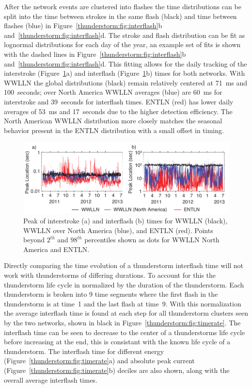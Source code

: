 After the network events are clustered into flashes the time distributions can be split into the time between strokes in the same flash (black) and time between flashes (blue) in Figure~\ref{thunderstorm:fig:interflash}b and~\ref{thunderstorm:fig:interflash}d.
The stroke and flash distribution can be fit as lognormal distributions for each day of the year, an example set of fits is shown with the dashed lines in Figure~\ref{thunderstorm:fig:interflash}b and~\ref{thunderstorm:fig:interflash}d.
This fitting allows for the daily tracking of the interstroke (Figure~\ref{thunderstorm:fig:stability}a) and interflash (Figure~\ref{thunderstorm:fig:stability}b) times for both networks.
With WWLLN the global distributions (black) remain relatively centered at 71~ms and 100~seconds; over North America WWLLN averages (blue) are 60~ms for interstroke and 39~seconds for interflash times.
ENTLN (red) has lower daily averages of 53~ms and 17~seconds due to the higher detection efficiency.
The North American WWLLN distribution more closely matches the seasonal behavior present in the ENTLN distribution with a small offset in timing.

\begin{figure}[ht!]
   \centering
   \includegraphics[scale=1]{thunderstorm/Figures/interflashStability.pdf}
   \caption{Peak of interstroke (a) and interflash (b) times for WWLLN (black), WWLLN over North America (blue), and ENTLN (red).
          Points beyond $2^{th}$ and $98^{th}$ percentiles shown as dots for WWLLN North America and ENTLN.}
   \label{thunderstorm:fig:stability}
\end{figure}

Directly comparing the time evolution of a thunderstorm interflash time will not work with thunderstorms of differing durations.
To account for this the thunderstorm life cycle in normalized by the duration of the thunderstorm.
Each thunderstorm is broken into 9 time segments where the first flash in the thunderstorm is at time~1 and the last flash at time~9.
With this normalization the average interflash time is found at each step for all thunderstorm clusters seen by the two networks, shown in black in Figure~\ref{thunderstorm:fig:timerate}.
The interflash time can be seen to decrease to the center of a thunderstorms life cycle before increasing at the end, this is consistant with the known life cycle of a thunderstorm.
The interflash time for different energy (Figure~\ref{thunderstorm:fig:timerate}a) and absolute peak current (Figure~\ref{thunderstorm:fig:timerate}b) deciles are also shown, along with the overall average interflash times.

